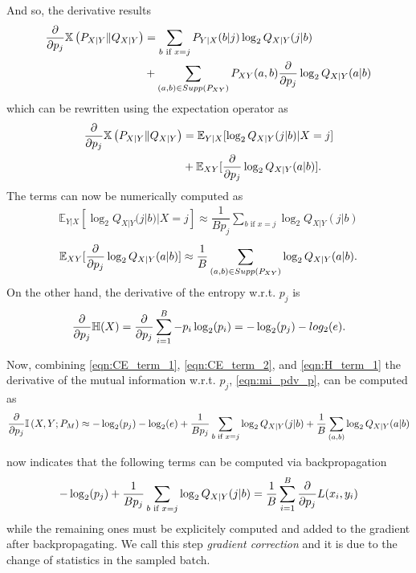 And so, the derivative results
\begin{align}
	\pdv{p_j} \mathbb{X}\left(P_{X|Y} \Vert Q_{X|Y}\right) &= \sum \limits_{b \text{ if } x=j} P_{Y|X}(b|j) \log_2 Q_{X|Y}(j|b) \\
	& + \sum \limits_{(a,b) \in Supp(P_{XY})} P_{XY}(a, b) \pdv{p_j} \log_2 Q_{X|Y}(a|b)
\end{align}
which can be rewritten using the expectation operator as
\begin{align}
	\pdv{p_j} \mathbb{X}\left(P_{X|Y} \Vert Q_{X|Y}\right) &= \mathbb{E}_{Y|X}[ \log_2 Q_{X|Y}(j|b)| X=j] \\
	& + \mathbb{E}_{XY}[ \pdv{p_j} \log_2 Q_{X|Y}(a|b)].
\end{align}
The terms can now be numerically computed as
\begin{align}
\label{eqn:CE_term_1}
	\mathbb{E}_{Y|X}[ \log_2 Q_{X|Y}(j|b)| X=j] \approx \dfrac{1}{Bp_j}\sum \limits_{b \text{ if } x=j} \log_2 Q_{X|Y}(j|b)
\end{align}
\begin{align}
\label{eqn:CE_term_2}
	\mathbb{E}_{XY}[ \pdv{p_j} \log_2 Q_{X|Y}(a|b)] \approx \dfrac{1}{B} \sum \limits_{(a,b) \in Supp(P_{XY})} \log_2 Q_{X|Y}(a|b).
\end{align}
On the other hand, the derivative of the entropy w.r.t. $p_j$ is
\begin{align}
\label{eqn:H_term_1}
	\pdv{p_j} \mathbb{H}(X) = \pdv{p_j} \sum \limits_{i = 1}^{B} - p_i \log_2(p_i) = - \log_2 (p_j) - log_2 (e).
\end{align}

Now, combining \ref{eqn:CE_term_1}, \ref{eqn:CE_term_2}, and \ref{eqn:H_term_1} the derivative of the mutual information w.r.t. $p_j$, \ref{eqn:mi_pdv_p}, can be computed as
\begin{align}
	\pdv{p_j} \mathbb{I} \left(X , Y ; P_M \right) \approx - \log_2 (p_j) - \log_2 (e) + \dfrac{1}{Bp_j}\sum \limits_{b \text{ if } x=j} \log_2 Q_{X|Y}(j|b) + \dfrac{1}{B} \sum \limits_{(a,b)} \log_2 Q_{X|Y}(a|b)
\end{align}

\citep{Aref} now indicates that the following terms can be computed via backpropagation
\begin{align}
	- \log_2 (p_j) + \dfrac{1}{Bp_j}\sum \limits_{b \text{ if } x=j} \log_2 Q_{X|Y}(j|b) = \dfrac{1}{B} \sum \limits_{i = 1}^{B} \pdv{p_j} L(x_i, y_i)
\end{align}
while the remaining ones must be explicitely computed and added to the gradient after backpropagating. We call this step \textit{gradient correction} and it is due to the change of statistics in the sampled batch.
